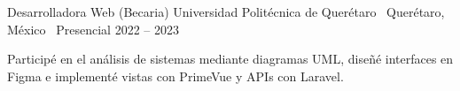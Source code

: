 \job
{Desarrolladora Web (Becaria)}
{Universidad Politécnica de Querétaro \textbar\ Querétaro, México \textbar\ Presencial}
{2022 -- 2023}
{}

\begin{jobitems}

\item Participé en el análisis de sistemas mediante diagramas UML, diseñé interfaces en Figma e implementé vistas con PrimeVue y APIs con Laravel.

\end{jobitems}
